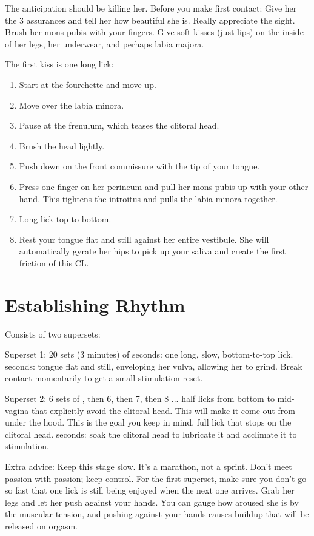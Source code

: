 \begin{outline}
\1 The anticipation should be killing her. Before you make first contact:
	\2 Give her the 3 assurances and tell her how beautiful she is.
	\2 Really appreciate the sight.
	\2 Brush her mons pubis with your fingers.
	\2 Give soft kisses (just lips) on the inside of her legs, her underwear, and perhaps labia majora.

\1 The first kiss is one long lick:
\begin{enumerate}
	\item Start at the fourchette and move up.
	\item Move over the labia minora.
	\item Pause at the frenulum, which teases the clitoral head.
	\item Brush the head lightly.
	\item Push down on the front commissure with the tip of your tongue.
	\item Press one finger on her perineum and pull her mons pubis up with your other hand. This tightens the introitus and pulls the labia minora together.
	\item Long lick top to bottom.
	\item Rest your tongue flat and still against her entire vestibule. She will automatically gyrate her hips to pick up your saliva and create the first friction of this CL.
\end{enumerate}
\end{outline}

\section{Establishing Rhythm}
Consists of two supersets:
\begin{outline}
\1 Superset 1: 20 sets (3 minutes) of
	 seconds: one long, slow, bottom-to-top lick.
	 seconds: tongue flat and still, enveloping her vulva, allowing her to grind.
	\2 Break contact momentarily to get a small stimulation reset.

\1 Superset 2: 6 sets of
	, then 6, then 7, then 8 ... half licks from bottom to mid-vagina that explicitly avoid the clitoral head. This will make it come out from under the hood. This is the goal you keep in mind.
	 full lick that stops on the clitoral head.
	 seconds: soak the clitoral head to lubricate it and acclimate it to stimulation.

\1 Extra advice:
	\2 Keep this stage slow. It's a marathon, not a sprint. Don't meet passion with passion; keep control.
	\2 For the first superset, make sure you don't go so fast that one lick is still being enjoyed when the next one arrives.
	\2 Grab her legs and let her push against your hands. You can gauge how aroused she is by the muscular tension, and pushing against your hands causes buildup that will be released on orgasm.
\end{outline}

